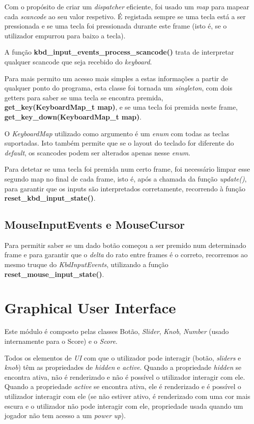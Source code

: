\documentclass{report}
\begin{document}
Com o propósito de criar um \textit{dispatcher} eficiente, foi usado um \textit{map} para mapear cada \textit{scancode} ao seu valor respetivo. É registada sempre se uma tecla está a ser pressionada e se uma tecla foi pressionada durante este frame (isto é, se o utilizador empurrou para baixo a tecla).

A função \textbf{kbd\_input\_events\_process\_scancode()} trata de interpretar qualquer scancode que seja recebido do \textit{keyboard}.

Para mais permito um acesso mais simples a estas informações a partir de qualquer ponto do programa, esta classe foi tornada um \textit{singleton}, com dois getters para saber se uma tecla se encontra premida, \textbf{get\_key(KeyboardMap\_t map)}, e se uma tecla foi premida neste frame, \textbf{get\_key\_down(KeyboardMap\_t map)}.

O \textit{KeyboardMap} utilizado como argumento é um \textit{enum} com todas as teclas suportadas. Isto também permite que se o layout do teclado for diferente do \textit{default}, os scancodes podem ser alterados apenas nesse \textit{enum}.

Para detetar se uma tecla foi premida num certo frame, foi necessário limpar esse segundo map no final de cada frame, isto é, após a chamada da função \textit{update()}, para garantir que os inputs são interpretados corretamente, recorrendo à função \textbf{reset\_kbd\_input\_state()}.\newline

\subsection{MouseInputEvents e MouseCursor}

Para permitir saber se um dado botão começou a ser premido num determinado frame e para garantir que o \textit{delta} do rato entre frames é o correto, recorremos ao mesmo truque do \textit{KbdInputEvents}, utilizando a função \textbf{reset\_mouse\_input\_state()}.


\section{Graphical User Interface}

Este módulo é composto pelas classes Botão, \textit{Slider}, \textit{Knob}, \textit{Number} (usado internamente para o Score) e o \textit{Score}.

Todos os elementos de \textit{UI} com que o utilizador pode interagir (botão, \textit{sliders} e \textit{knob}) têm as propriedades de \textit{hidden} e \textit{active}. Quando a propriedade \textit{hidden} se encontra ativa, não é renderizado e não é possível o utilizador interagir com ele. Quando a propriedade \textit{active} se encontra ativa, ele é renderizado e é possível o utilizador interagir com ele (se não estiver ativo, é renderizado com uma cor mais escura e o utilizador não pode interagir com ele, propriedade usada quando um jogador não tem acesso a um \textit{power up}).
\end{document}
